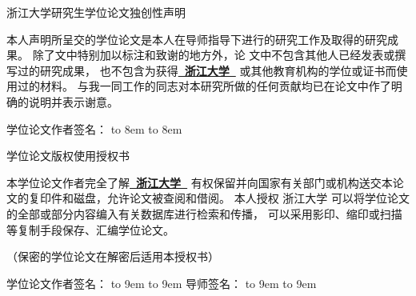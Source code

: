   \vspace*{-2mm}

  {\songti

  \begin{center}
    {\noindent\songti{}浙江大学研究生学位论文独创性声明}\\
  \end{center}

  {\setlength{\baselineskip}{1.3\baselineskip}
  本人声明所呈交的学位论文是本人在导师指导下进行的研究工作及取得的研究成果。
  除了文中特别加以标注和致谢的地方外，论
  文中不包含其他人已经发表或撰写过的研究成果，
  也不包含为获得{\bfseries\kaishu{}\underline{~浙江大学~}}
  或其他教育机构的学位或证书而使用过的材料。
  与我一同工作的同志对本研究所做的任何贡献均已在论文中作了明确的说明并表示谢意。

  \vspace{10ex}

  {\songti{}学位论文作者签名：
  \ifpdf
  {\hbox to 8em{}}%
  \else
  {\hbox to 8em{}}%
  \fi
  \PutsigndateA}
  
  \vspace{12ex}

  \begin{center}
    {\noindent\songti{}学位论文版权使用授权书}
  \end{center}

  本学位论文作者完全了解{\bfseries\kaishu{}\underline{~浙江大学~}}
  有权保留并向国家有关部门或机构送交本论文的复印件和磁盘，允许论文被查阅和借阅。
  本人授权 浙江大学 可以将学位论文的全部或部分内容编入有关数据库进行检索和传播，
  可以采用影印、缩印或扫描等复制手段保存、汇编学位论文。

  （保密的学位论文在解密后适用本授权书）

  \vspace{2ex}

  学位论文作者签名：
  \ifpdf
  {\hbox to 9em{}}%
  \else
  {\hbox to 9em{}}%
  \fi
  导师签名：
  \ifpdf
  {\hbox to 9em{}}%
  \else
  {\hbox to 9em{}}%
  \fi

  \vspace{2ex}

  \PutsigndateB
  \hspace{3em}
  \PutsigndateC}
  }
